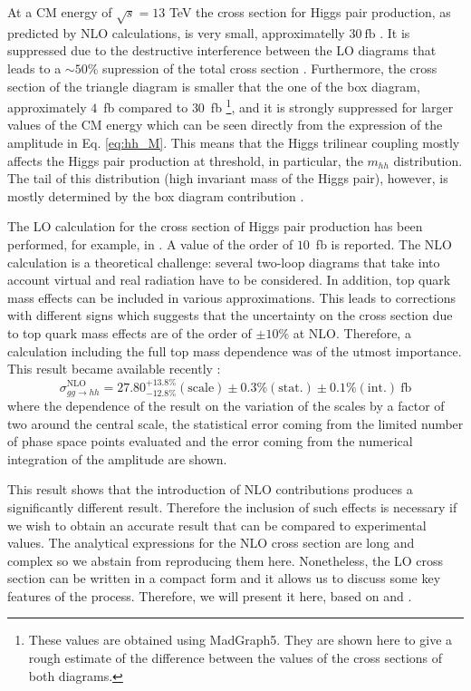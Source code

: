 At a CM energy of $\sqrt{s}=13$ TeV the cross section for Higgs pair production, as predicted by NLO calculations, is very small, approximatelly $30~\text{fb}$ \cite{hhxsNLO}. It is suppressed due to the destructive interference between the LO diagrams that leads to a $\sim 50\%$ supression of the total cross section \cite{FCCyellow}. Furthermore, the cross section of the triangle diagram is smaller that the one of the box diagram, approximately $4$~fb compared to $30$~fb \footnote{These values are obtained using MadGraph5. They are shown here to give a rough estimate of the difference between the values of the cross sections  of both diagrams.}, and it is strongly suppressed for larger values of the CM energy which can be seen directly from the expression of the amplitude in Eq. \ref{eq:hh_M}. This means that the Higgs trilinear coupling mostly affects the Higgs pair production at threshold, in particular, the $m_{hh}$ distribution. The tail of this distribution (high invariant mass of the Higgs pair), however, is mostly determined by the box diagram contribution \cite{FCCyellow}.  

The LO calculation for the cross section of Higgs pair production has been performed, for example, in \cite{HHxs_LO}. A value of the order of $10$~fb is reported. The NLO calculation is a theoretical challenge: several two-loop diagrams that take into account virtual and real radiation have to be considered. In addition, top quark mass effects can be included in various approximations. This leads to corrections with different signs which suggests that the uncertainty on the cross section due to top quark mass effects are of the order of $\pm 10\%$ at NLO. Therefore, a calculation including the full top mass dependence was of the utmost importance. This result became available recently \cite{HHcalc_top}:
\begin{equation}
\sigma^{\text{NLO}}_{gg\rightarrow hh} = 27.80^{+13.8\%}_{-12.8\%}(\text{scale})\pm 0.3\%(\text{stat.})\pm 0.1\% (\text{int.})~\text{fb}
\end{equation}
where the dependence of the result on the variation of the scales by a factor of two around the central scale, the statistical error coming from the limited number of phase space points evaluated and the error coming from the numerical integration of the amplitude are shown. 

This result shows that the introduction of NLO contributions produces a significantly different result. Therefore the inclusion of such effects is necessary if we wish to obtain an accurate result that can be compared to experimental values. The analytical expressions for the NLO cross section are long and complex so we abstain from reproducing them here. Nonetheless, the LO cross section can be written in a compact form and it allows us to discuss some key features of the process. Therefore, we will present it here, based on \cite{HHxs_LO} and \cite{HHxs_LO1}.

